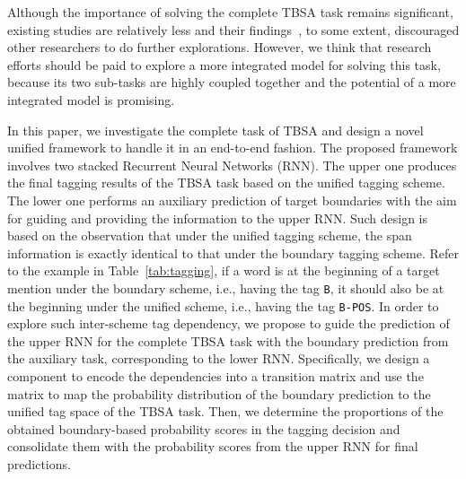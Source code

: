 \documentclass[letterpaper]{article} %
\begin{document}
Although the importance of solving the complete TBSA task remains significant, existing studies are relatively less and their findings~\cite{D13-1171,D15-1073}, to some extent, discouraged other researchers to do further explorations. However, we think that research efforts should be paid to explore a more integrated model for solving this task, because its two sub-tasks are highly coupled together and the potential of a more integrated model is promising.  


In this paper, we investigate the complete task of TBSA and design a novel unified framework to handle it in an end-to-end fashion. The proposed framework involves two stacked Recurrent Neural Networks (RNN). The upper one produces the final tagging results of the TBSA task based on the unified tagging scheme. The lower one performs an auxiliary prediction of target boundaries with the aim for guiding and providing the information to the upper RNN. 
Such design is based on the observation that under the unified tagging scheme, the span information is exactly identical to that under the boundary tagging scheme. Refer to the example in Table~\ref{tab:tagging}, if a word is at the beginning of a target mention under the boundary scheme, i.e., having the tag \texttt{B}, it should also be at the beginning under the unified scheme, i.e., having the tag \texttt{B-POS}. In order to explore such inter-scheme tag dependency, we propose to guide the prediction of the upper RNN for the complete TBSA task with the boundary prediction from the auxiliary task, corresponding to the lower RNN. Specifically, we design a component to encode the dependencies into a transition matrix and use the matrix to map the probability distribution of the boundary prediction to the unified tag space of the TBSA task. Then, we determine the proportions of the obtained boundary-based probability scores in the tagging decision and consolidate them with the probability scores from the upper RNN for final predictions.
\end{document}
